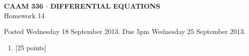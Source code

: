 \documentclass[10pt]{article}
\begin{document}
\vspace*{-5em}
\begin{center}
\large \textsf{\textbf{CAAM 336 $\cdot$ DIFFERENTIAL EQUATIONS}\\[0.5em]
Homework 14 }
\end{center}

Posted Wednesday 18 September 2013. Due 5pm Wednesday 25 September 2013.

\begin{enumerate}\addtocounter{enumi}{13}
\item {[25 points]}\\  

\end{enumerate}
\end{document}
